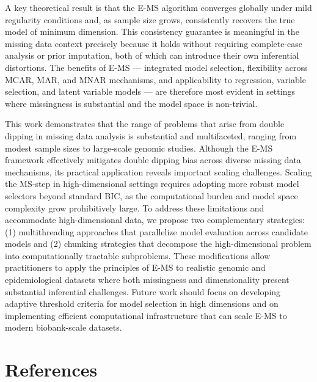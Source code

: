 \documentclass[
  12pt,
]{article}
\begin{document}
A key theoretical result is that the E-MS algorithm converges globally under 
mild regularity conditions and, as sample size grows, consistently recovers 
the true model of minimum dimension. This consistency guarantee is meaningful 
in the missing data context precisely because it holds without requiring 
complete-case analysis or prior imputation, both of which can introduce their 
own inferential distortions. The benefits of E-MS — integrated model 
selection, flexibility across MCAR, MAR, and MNAR mechanisms, and 
applicability to regression, variable selection, and latent variable models — 
are therefore most evident in settings where missingness is substantial and 
the model space is non-trivial.

This work demonstrates that the range of problems that arise from double 
dipping in missing data analysis is substantial and multifaceted, ranging 
from modest sample sizes to large-scale genomic studies. Although the E-MS 
framework effectively mitigates double dipping bias across diverse missing 
data mechanisms, its practical application reveals important scaling 
challenges. Scaling the MS-step in high-dimensional settings requires 
adopting more robust model selectors beyond standard BIC, as the 
computational burden and model space complexity grow prohibitively large. 
To address these limitations and accommodate high-dimensional data, we 
propose two complementary strategies: (1) multithreading approaches that 
parallelize model evaluation across candidate models and (2) chunking 
strategies that decompose the high-dimensional problem into computationally 
tractable subproblems. These modifications allow practitioners to apply the 
principles of E-MS to realistic genomic and epidemiological datasets where 
both missingness and dimensionality present substantial inferential 
challenges. Future work should focus on developing adaptive threshold 
criteria for model selection in high dimensions and on implementing efficient 
computational infrastructure that can scale E-MS to modern 
biobank-scale datasets.

\clearpage

\hypertarget{references}{%
\section{References}\label{references}}
\end{document}
